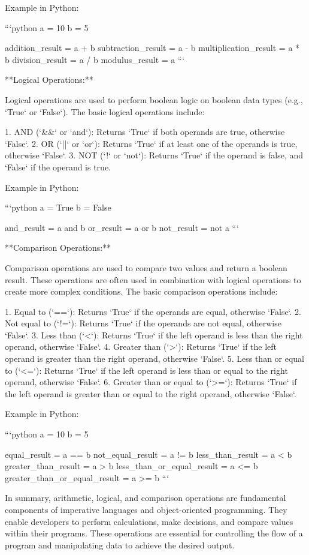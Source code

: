 \documentclass{article}
\begin{document}
Example in Python:

```python
a = 10
b = 5

addition_result = a + b
subtraction_result = a - b
multiplication_result = a * b
division_result = a / b
modulus_result = a %
```

**Logical Operations:**

Logical operations are used to perform boolean logic on boolean data types (e.g., `True` or `False`). The basic logical operations include:

1. AND (`&&` or `and`): Returns `True` if both operands are true, otherwise `False`.
2. OR (`||` or `or`): Returns `True` if at least one of the operands is true, otherwise `False`.
3. NOT (`!` or `not`): Returns `True` if the operand is false, and `False` if the operand is true.

Example in Python:

```python
a = True
b = False

and_result = a and b
or_result = a or b
not_result = not a
```

**Comparison Operations:**

Comparison operations are used to compare two values and return a boolean result. These operations are often used in combination with logical operations to create more complex conditions. The basic comparison operations include:

1. Equal to (`==`): Returns `True` if the operands are equal, otherwise `False`.
2. Not equal to (`!=`): Returns `True` if the operands are not equal, otherwise `False`.
3. Less than (`<`): Returns `True` if the left operand is less than the right operand, otherwise `False`.
4. Greater than (`>`): Returns `True` if the left operand is greater than the right operand, otherwise `False`.
5. Less than or equal to (`<=`): Returns `True` if the left operand is less than or equal to the right operand, otherwise `False`.
6. Greater than or equal to (`>=`): Returns `True` if the left operand is greater than or equal to the right operand, otherwise `False`.

Example in Python:

```python
a = 10
b = 5

equal_result = a == b
not_equal_result = a != b
less_than_result = a < b
greater_than_result = a > b
less_than_or_equal_result = a <= b
greater_than_or_equal_result = a >= b
```

In summary, arithmetic, logical, and comparison operations are fundamental components of imperative languages and object-oriented programming. They enable developers to perform calculations, make decisions, and compare values within their programs. These operations are essential for controlling the flow of a program and manipulating data to achieve the desired output.
\end{document}
